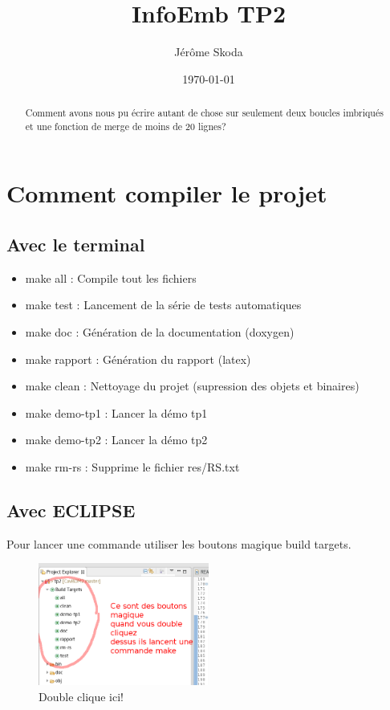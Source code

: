 \documentclass[a4paper]{article}
\title{InfoEmb TP2}
\author{Jérôme Skoda}
\date{\today}
\begin{document}
\maketitle

\begin{abstract}
Comment avons nous pu écrire autant de chose sur seulement deux boucles imbriqués et une fonction de merge de moins de 20 lignes?
\end{abstract}

\section{Comment compiler le projet}

\subsection{Avec le terminal}

\begin{itemize}
	\item make all : Compile tout les fichiers
	\item make test : Lancement de la série de tests automatiques
	\item make doc  : Génération de la documentation (doxygen)
	\item make rapport : Génération du rapport (latex)
	\item make clean : Nettoyage du projet (supression des objets et binaires)
	\item make demo-tp1 : Lancer la démo tp1
	\item make demo-tp2 : Lancer la démo tp2
	\item make rm-rs : Supprime le fichier res/RS.txt
\end{itemize}

\subsection{Avec ECLIPSE}

Pour lancer une commande utiliser les boutons magique build targets.

\begin{figure}[h!] 
\centering
\includegraphics[width=0.5\textwidth]{bouton-magique.png}
\caption{Double clique ici!}
\end{figure}
\end{document}
